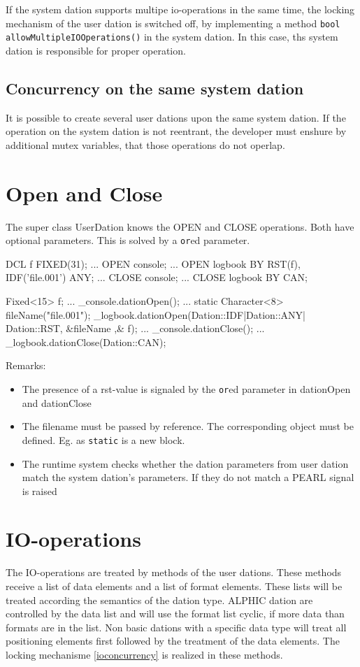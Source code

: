 If the system dation supports multipe io-operations in the same time,
the locking mechanism of the user dation is switched off, by implementing
a method \verb|bool allowMultipleIOOperations()| in the system dation.
In this case, ths system dation is responsible for proper operation.

\subsection{Concurrency on the same system dation}
It is possible to create several user dations upon the same system dation.
If the operation on the system dation is not reentrant, the developer must
enshure by additional mutex variables, that those operations do not operlap.

\section{Open and Close}
The super class UserDation knows the OPEN and CLOSE operations.
Both have optional parameters. This is solved by a \verb|or|ed
parameter.

\begin{PEARLCode}
DCL f FIXED(31);
...
OPEN console;
...
OPEN logbook BY RST(f), IDF('file.001') ANY;
...
CLOSE console;
...
CLOSE logbook BY CAN;
\end{PEARLCode}

\begin{CppCode}
Fixed<15> f;
...
_console.dationOpen();
...
{
   static Character<8> fileName("file.001");
   _logbook.dationOpen(Dation::IDF|Dation::ANY| Dation::RST, &fileName ,& f);
}
...
_console.dationClose();
...
_logbook.dationClose(Dation::CAN);
\end{CppCode}

Remarks:
\begin{itemize}
\item The presence of a rst-value is signaled by the \verb|or|ed parameter
   in dationOpen and dationClose
\item The filename must be passed by reference. The corresponding
   object must be defined. Eg. as \verb|static| is a new block.
\item The runtime system checks whether the dation parameters from
   user dation match the system dation's parameters. 
   If they do not match a PEARL signal is raised
\end{itemize}

\section{IO-operations}
The IO-operations are treated by methods  of the user dations.
These methods receive a list of data elements and a list of format
elements. These lists will be treated according the semantics of the dation
type. ALPHIC dation are controlled by the data list and will use
the format list cyclic, if more data than formats are in the list.
Non basic dations with a specific data type will treat all positioning
elements first followed by the treatment of the data elements. 
The locking mechanisme \ref{ioconcurrency} is realized in these methods.

